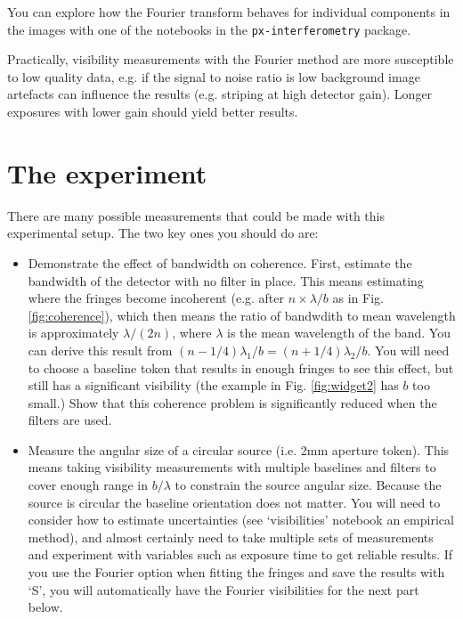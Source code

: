 \documentclass[11pt]{article}
\begin{document}
You can explore how the Fourier transform behaves for individual components in the images with one of the notebooks in the \texttt{px-interferometry} package.

Practically, visibility measurements with the Fourier method are more susceptible to low quality data, e.g. if the signal to noise ratio is low background image artefacts can influence the results (e.g. striping at high detector gain). Longer exposures with lower gain should yield better results.

\clearpage
\section{The experiment}

There are many possible measurements that could be made with this experimental setup. The two key ones you should do are:
\begin{itemize}
    \item Demonstrate the effect of bandwidth on coherence. First, estimate the bandwidth of the detector with no filter in place. This means estimating where the fringes become incoherent (e.g. after $n \times \lambda/b$ as in Fig. \ref{fig:coherence}), which then means the ratio of bandwdith to mean wavelength is approximately $\lambda/(2n)$, where $\lambda$ is the mean wavelength of the band. You can derive this result from $(n-1/4)\lambda_1/b = (n+1/4)\lambda_2/b$. You will need to choose a baseline token that results in enough fringes to see this effect, but still has a significant visibility (the example in Fig. \ref{fig:widget2} has $b$ too small.) Show that this coherence problem is significantly reduced when the filters are used.
    \item Measure the angular size of a circular source (i.e. 2mm aperture token). This means taking visibility measurements with multiple baselines and filters to cover enough range in $b/\lambda$ to constrain the source angular size. Because the source is circular the baseline orientation does not matter. You will need to consider how to estimate uncertainties (see `visibilities' notebook an empirical method), and almost certainly need to take multiple sets of measurements and experiment with variables such as exposure time to get reliable results. If you use the Fourier option when fitting the fringes and save the results with `S', you will automatically have the Fourier visibilities for the next part below.
\end{itemize}
\end{document}
